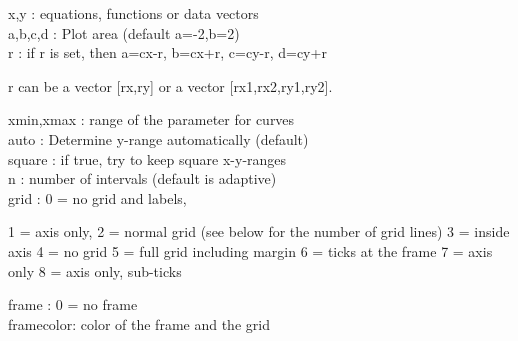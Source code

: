 \documentclass[a4paper,10pt]{article}
\begin{document}
\begin{eulernotebook}
\begin{eulercomment}
\begin{eulercomment}
\begin{eulercomment}
\begin{eulercomment}
\begin{eulercomment}
\begin{eulercomment}
\begin{eulercomment}
\begin{eulercomment}
\begin{eulercomment}
\begin{eulercomment}
\begin{eulercomment}
\begin{eulercomment}
\begin{eulercomment}
\begin{eulercomment}
\begin{eulercomment}
\begin{eulercomment}
\begin{eulercomment}
\begin{eulercomment}
\begin{eulercomment}
\begin{eulercomment}
\begin{eulercomment}
\begin{eulercomment}
\begin{eulercomment}
\begin{eulercomment}
\begin{eulercomment}
\begin{eulercomment}
\begin{eulercomment}
\begin{eulercomment}
\begin{eulercomment}
\begin{eulercomment}
\begin{eulercomment}
\begin{eulercomment}
\begin{eulercomment}
\begin{eulercomment}
\begin{eulercomment}
\begin{eulercomment}
\begin{eulercomment}
\begin{eulercomment}
\begin{eulercomment}
x,y       : equations, functions or data vectors\\
a,b,c,d   : Plot area (default a=-2,b=2)\\
r         : if r is set, then a=cx-r, b=cx+r, c=cy-r, d=cy+r\\
\end{eulercomment}
\begin{eulerttcomment}
           r can be a vector [rx,ry] or a vector [rx1,rx2,ry1,ry2].
\end{eulerttcomment}
\begin{eulercomment}
xmin,xmax : range of the parameter for curves\\
auto      : Determine y-range automatically (default)\\
square    : if true, try to keep square x-y-ranges\\
n         : number of intervals (default is adaptive)\\
grid      : 0 = no grid and labels,\\
\end{eulercomment}
\begin{eulerttcomment}
            1 = axis only,
            2 = normal grid (see below for the number of grid lines)
            3 = inside axis
            4 = no grid
            5 = full grid including margin
            6 = ticks at the frame
            7 = axis only
            8 = axis only, sub-ticks
\end{eulerttcomment}
\begin{eulercomment}
frame     : 0 = no frame\\
framecolor: color of the frame and the grid\\

\end{eulercomment}
\end{eulercomment}
\end{eulercomment}
\end{eulercomment}
\end{eulercomment}
\end{eulercomment}
\end{eulercomment}
\end{eulercomment}
\end{eulercomment}
\end{eulercomment}
\end{eulercomment}
\end{eulercomment}
\end{eulercomment}
\end{eulercomment}
\end{eulercomment}
\end{eulercomment}
\end{eulercomment}
\end{eulercomment}
\end{eulercomment}
\end{eulercomment}
\end{eulercomment}
\end{eulercomment}
\end{eulercomment}
\end{eulercomment}
\end{eulercomment}
\end{eulercomment}
\end{eulercomment}
\end{eulercomment}
\end{eulercomment}
\end{eulercomment}
\end{eulercomment}
\end{eulercomment}
\end{eulercomment}
\end{eulercomment}
\end{eulercomment}
\end{eulercomment}
\end{eulercomment}
\end{eulercomment}
\end{eulercomment}
\end{eulernotebook}
\end{document}
